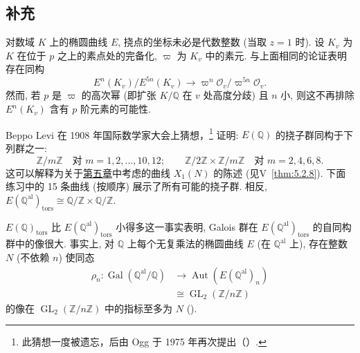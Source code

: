 \subsection*{补充}

\begin{aside} \label{thm:2.5.10} 
对数域 $K$ 上的椭圆曲线 $E$, 挠点的坐标未必是代数整数 (当取 $z = 1$ 时). 设 $K_v$ 为 $K$ 在位于 $p$ 之上的素点处的完备化, $\varpi$ 为 $K_v$ 中的素元. 与上面相同的论证表明存在同构
\[
E^n(K_v)/E^{5n}(K_v) \to \varpi^n\mathcal{O}_v/\varpi^{5n}\mathcal{O}_v.
\]
然而, 若 $p$ 是 $\varpi$ 的高次幂 (即扩张 $K/\mathbb{Q}$ 在 $v$ 处高度分歧) 且 $n$ 小, 则这不再排除 $E^n(K_v)$ 含有 $p$ 阶元素的可能性.
\end{aside}

\begin{aside} \label{thm:2.5.11} 
Beppo Levi 在 1908 年国际数学家大会上猜想，\footnote{此猜想一度被遗忘，后由 Ogg 于 1975 年再次提出（\cite{schappacher1996}）.} \cite[III, 5.1]{mazur1977} 证明: $E(\mathbb{Q})$ 的挠子群同构于下列群之一:
\[
\mathbb{Z}/m\mathbb{Z} \quad \text{对 } m = 1,2,\dots,10,12; \qquad
\mathbb{Z}/2\mathbb{Z}\times\mathbb{Z}/m\mathbb{Z} \quad \text{对 } m = 2,4,6,8.
\]
这可以解释为关于\hyperref[ch:5]{第五章}中考虑的曲线 $X_1(N)$ 的陈述 (见V~\ref{thm:5.2.8}). 下面练习中的 15 条曲线 (按顺序) 展示了所有可能的挠子群. 相反, $E(\mathbb{Q}^{\mathrm{al}})_{\mathrm{tors}}\cong\mathbb{Q}/\mathbb{Z}\times\mathbb{Q}/\mathbb{Z}$.
\end{aside}

\begin{aside} \label{thm:2.5.12} 
$E(\mathbb{Q})_{\mathrm{tors}}$ 比 $E(\mathbb{Q}^{\mathrm{al}})_{\mathrm{tors}}$ 小得多这一事实表明, Galois 群在 $E(\mathbb{Q}^{\mathrm{al}})_{\mathrm{tors}}$ 的自同构群中的像很大. 事实上, 对 $\mathbb{Q}$ 上每个无复乘法的椭圆曲线 $E$ (在 $\mathbb{Q}^{\mathrm{al}}$ 上), 存在整数 $N$ (不依赖 $n$) 使同态
\[
\begin{aligned}
\rho_n\colon\operatorname{Gal}(\mathbb{Q}^{\mathrm{al}}/\mathbb{Q})
&\to\operatorname{Aut}(E(\mathbb{Q}^{\mathrm{al}})_n)\\
&\cong\operatorname{GL}_2(\mathbb{Z}/n\mathbb{Z})
\end{aligned}
\]
的像在 $\operatorname{GL}_2(\mathbb{Z}/n\mathbb{Z})$ 中的指标至多为 $N$ (\cite{serre1972}).
\end{aside}

